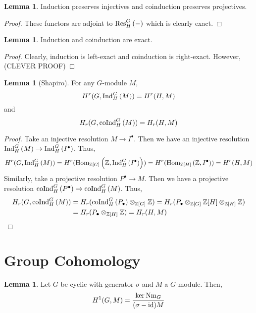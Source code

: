\documentclass[12pt]{extarticle}
\newcommand{\Hom}[3]{\mathrm{Hom}_{#1}\left( #2, #3 \right)}
\newcommand{\Z}{\mathbb{Z}}
\newcommand{\id}{\mathrm{id}}
\theoremstyle{definition}
\newtheorem{lemma}[theorem]{Lemma}
\begin{document}
\begin{lemma}
Induction preserves injectives and coinduction preserves projectives.
\end{lemma}

\begin{proof}
These functors are adjoint to $\mathrm{Res}^{G}_{H} \left( - \right)$ which is clearly exact.
\end{proof}

\begin{lemma}
Induction and coinduction are exact.
\end{lemma}

\begin{proof}
Clearly, induction is left-exact and coinduction is right-exact. However, (CLEVER PROOF)
\end{proof}

\begin{lemma}[Shapiro]
For any $G$-module $M$,
\[ H^r(G, \mathrm{Ind}^{G}_{H} \left(M\right)) = H^r(H, M) \]
and
\[ H_r(G, \mathrm{coInd}^{G}_{H} \left(M\right)) = H_r(H, M) \]
\end{lemma}

\begin{proof}
Take an injective resolution $M \to I^\bullet$. Then we have an injective resolution $\mathrm{Ind}^{G}_{H} \left(M\right) \to \mathrm{Ind}^{G}_{H} \left(I^\bullet\right)$. Thus,
\begin{align*}
H^r(G, \Ind{G}{H}{M}) = H^r(\Hom{\Z[G]}{\Z}{\Ind{G}{H}{I^\bullet}}) = H^r(\Hom{\Z[H]}{\Z}{I^\bullet}) = H^r(H, M) 
\end{align*}
Similarly, take a projective resolution $P^\bullet \to M$. Then we have a projective resolution $\mathrm{coInd}^{G}_{H} \left(P^\bullet\right) \to \mathrm{coInd}^{G}_{H} \left(M\right)$. Thus,
\begin{align*}
H_r(G, \coInd{G}{H}{M}) & = H_r(\coInd{G}{H}{P_\bullet} \otimes_{\Z[G]} \Z) = H_r(P_\bullet \otimes_{\Z[G]} \Z[H] \otimes_{\Z[H]} \Z)
\\
& = H_r(P_\bullet \otimes_{\Z[H]} \Z) = H_r(H, M) 
\end{align*}
\end{proof}


\section{Group Cohomology}

\begin{lemma}
Let $G$ be cyclic with generator $\sigma$ and $M$ a $G$-module. Then,
\[ H^1(G, M) = \frac{\ker{\Nm_G}}{(\sigma - \id) M} \]
\end{lemma}
\end{document}
